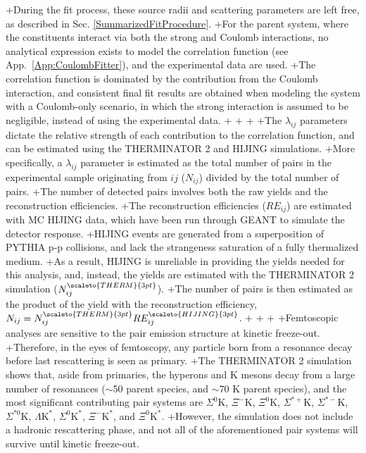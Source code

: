 +During the fit process, these source radii and scattering parameters are left free, as described in Sec. \ref{SummarizedFitProcedure}.
+For the \XiKpm parent system, where the constituents interact via both the strong and Coulomb interactions, no analytical expression exists to model the correlation function (see App.\ \ref{App:CoulombFitter}), and the experimental \XiKpm data are used.
+The \XiKpm correlation function is dominated by the contribution from the Coulomb interaction, and consistent final fit results are obtained when modeling \XiKpm the system with a Coulomb-only scenario, in which the strong interaction is assumed to be negligible, instead of using the experimental data.
+
+
+
+The $\lambda_{ij}$ parameters dictate the relative strength of each contribution to the correlation function, and can be estimated using the THERMINATOR 2 and HIJING simulations.
+More specifically, a $\lambda_{ij}$ parameter is estimated as the total number of \LamK pairs in the experimental sample originating from $ij$ ($N_{ij}$) divided by the total number of \LamK pairs.
+The number of detected \LamK pairs involves both the raw yields and the reconstruction efficiencies.
+The reconstruction efficiencies ($RE_{ij}$) are estimated with MC HIJING data, which have been run through GEANT to simulate the detector response.
+HIJING events are generated from a superposition of PYTHIA p-p collisions, and lack the strangeness saturation of a fully thermalized medium.
+As a result, HIJING is unreliable in providing the yields needed for this analysis, and, instead, the yields are estimated with the THERMINATOR 2 simulation ($N_{ij}^{\scaleto{THERM}{3pt}}$).
+The number of \LamK pairs is then estimated as the product of the yield with the reconstruction efficiency, $N_{ij} = N_{ij}^{\scaleto{THERM}{3pt}}RE_{ij}^{\scaleto{HIJING}{3pt}}$.
+
+
+
+Femtoscopic analyses are sensitive to the pair emission structure at kinetic freeze-out.
+Therefore, in the eyes of femtoscopy, any particle born from a resonance decay before last rescattering is seen as primary.
+The THERMINATOR 2 simulation shows that, aside from primaries, the \Lam hyperons and K mesons decay from a large number of resonances ($\sim$50 \Lam parent species, and $\sim$70 K parent species), and the most significant contributing pair systems are $\Sigma^{0}$K, $\Xi^{-}$K, $\Xi^{0}$K, $\Sigma^{*+}$K, $\Sigma^{*-}$K, $\Sigma^{*0}$K, $\Lambda\mathrm{K}^{*}$, $\Sigma^{0}\mathrm{K}^{*}$, $\Xi^{-}\mathrm{K}^{*}$, and $\Xi^{0}\mathrm{K}^{*}$.
+However, the simulation does not include a hadronic rescattering phase, and not all of the aforementioned pair systems will survive until kinetic freeze-out.
